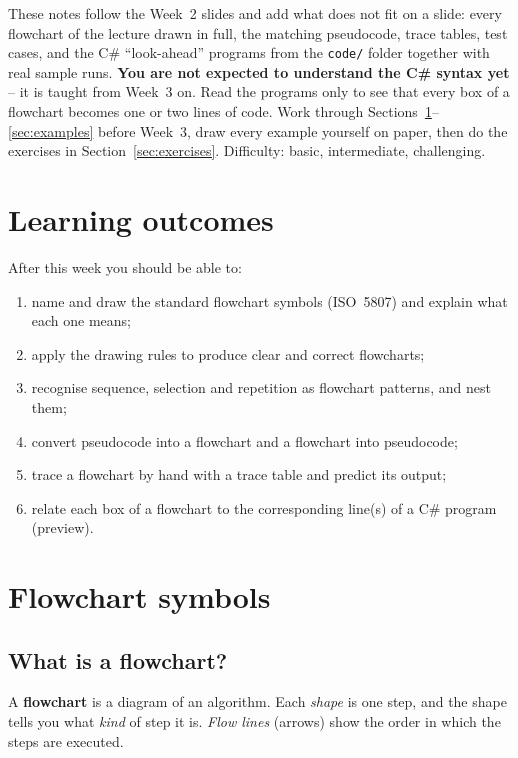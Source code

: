 \documentclass[11pt,a4paper]{article}
\begin{document}
\makemcmptitle

\begin{notebox}
These notes follow the Week~2 slides and add what does not fit on a slide: every flowchart of the lecture drawn in full, the matching pseudocode, trace tables, test cases, and the C\# ``look-ahead'' programs from the \texttt{code/} folder together with real sample runs. \textbf{You are not expected to understand the C\# syntax yet} -- it is taught from Week~3 on. Read the programs only to see that every box of a flowchart becomes one or two lines of code. Work through Sections~\ref{sec:symbols}--\ref{sec:examples} before Week~3, draw every example yourself on paper, then do the exercises in Section~\ref{sec:exercises}. Difficulty:  basic,  intermediate,  challenging.
\end{notebox}

{\small\setcounter{tocdepth}{1}\tableofcontents}

\section*{Learning outcomes}
After this week you should be able to:
\begin{enumerate}[leftmargin=*,itemsep=1pt]
  \item name and draw the standard flowchart symbols (ISO~5807) and explain what each one means;
  \item apply the drawing rules to produce clear and correct flowcharts;
  \item recognise sequence, selection and repetition as flowchart patterns, and nest them;
  \item convert pseudocode into a flowchart and a flowchart into pseudocode;
  \item trace a flowchart by hand with a trace table and predict its output;
  \item relate each box of a flowchart to the corresponding line(s) of a C\# program (preview).
\end{enumerate}

\section{Flowchart symbols}\label{sec:symbols}

\subsection{What is a flowchart?}
\begin{defbox}[Definition]
A \textbf{\color{amber}flowchart} is a diagram of an algorithm. Each \emph{shape} is one step, and the shape tells you what \emph{kind} of step it is. \emph{Flow lines} (arrows) show the order in which the steps are executed.
\end{defbox}
\end{document}

